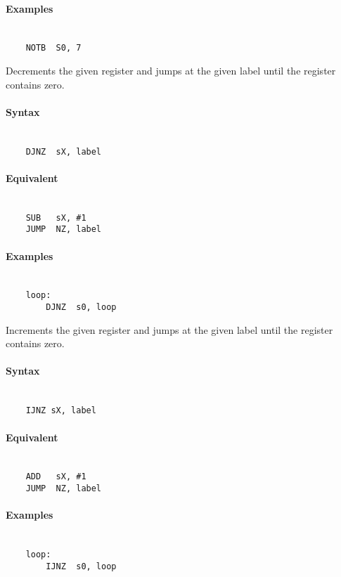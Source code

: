     \paragraph{Examples}
        ~\\
        \verb'    NOTB  S0, 7'

    Decrements the given register and jumps at the given label until the register contains zero.

    \paragraph{Syntax}
        ~\\
        \verb'    DJNZ  sX, label'

    \paragraph{Equivalent}
        ~\\
        \verb'    SUB   sX, #1'\\
        \verb'    JUMP  NZ, label'

    \paragraph{Examples}
        ~\\
        \verb'    loop:             '\\
        \verb'        DJNZ  s0, loop'

\clearpage
{}
    Increments the given register and jumps at the given label until the register contains zero.

    \paragraph{Syntax}
        ~\\
        \verb'    IJNZ sX, label'

    \paragraph{Equivalent}
        ~\\
        \verb'    ADD   sX, #1'\\
        \verb'    JUMP  NZ, label'

    \paragraph{Examples}
        ~\\
        \verb'    loop:             '\\
        \verb'        IJNZ  s0, loop'
